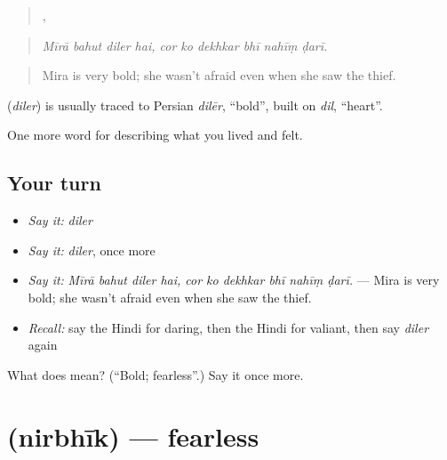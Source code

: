 \begin{quote}
   ,      
\end{quote}

\begin{quote}
\emph{Mīrā bahut diler hai, cor ko dekhkar bhī nahīṃ ḍarī.}
\end{quote}

\begin{quote}
Mira is very bold; she wasn't afraid even when she saw the thief.
\end{quote}

\begin{cousinweb}
\textbf{} (\emph{diler}) is usually traced to Persian \emph{dilēr}, \textquotedblleft{}bold\textquotedblright{}, built on \emph{dil}, \textquotedblleft{}heart\textquotedblright{}.
\end{cousinweb}

\begin{grammarlens}[title={What you've built}]
One more word for describing what you lived and felt.
\end{grammarlens}

\subsection*{Your turn}
\begin{itemize}
\raggedright
  \item \emph{Say it:} \emph{diler}
  \item \emph{Say it:} \emph{diler}, once more
  \item \emph{Say it:} \emph{Mīrā bahut diler hai, cor ko dekhkar bhī nahīṃ ḍarī.} — Mira is very bold; she wasn't afraid even when she saw the thief.
  \item \emph{Recall:} say the Hindi for daring, then the Hindi for valiant, then say \emph{diler} again
\end{itemize}

\begin{tcolorbox}[breakable,colback=teal!4,colframe=teal!35!black,title={Before you move on}]
What does  mean? (\textquotedblleft{}Bold; fearless\textquotedblright{}.) Say it once more.
\end{tcolorbox}
\section[\texorpdfstring{\hi{निर्भीक} (nirbhīk)}{निर्भीक (nirbhīk)}]{ (nirbhīk) — fearless}

